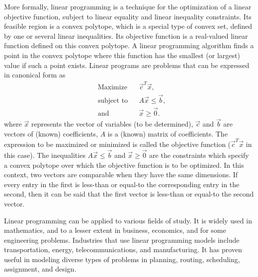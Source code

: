 More formally, linear programming is a technique for the optimization of a linear objective function, subject to linear equality and linear inequality constraints. Its feasible region is a convex polytope, which is a special type of convex set, defined by one or several linear inequalities. Its objective function is a real-valued linear function defined on this convex polytope. A linear programming algorithm finds a point in the convex polytope where this function has the smallest (or largest) value if such a point exists. Linear programs are problems that can be expressed in canonical form as
$${\displaystyle {\begin{aligned}&{\text{Maximize}}&&\vec{c}^T \vec{x}, \\&{\text{subject to}}&&A\vec{x} \leq \vec {b}, \\&{\text{and}}&&\vec{x} \geq \vec{0}. \end{aligned}}}$$
where $\vec{x}$ represents the vector of variables (to be determined), $\vec{c}$ and $\vec{b}$ are vectors of (known) coefficients, $A$ is a (known) matrix of coefficients. The expression to be maximized or minimized is called the objective function ($\vec{c}^T \vec{x}$ in this case). The inequalities $A\vec{x} \leq \vec {b}$ and $\vec{x} \geq \vec{0}$ are the constraints which specify a convex polytope over which the objective function is to be optimized. In this context, two vectors are comparable when they have the same dimensions. If every entry in the first is less-than or equal-to the corresponding entry in the second, then it can be said that the first vector is less-than or equal-to the second vector.

Linear programming can be applied to various fields of study. It is widely used in mathematics, and to a lesser extent in business, economics, and for some engineering problems. Industries that use linear programming models include transportation, energy, telecommunications, and manufacturing. It has proven useful in modeling diverse types of problems in planning, routing, scheduling, assignment, and design. 


